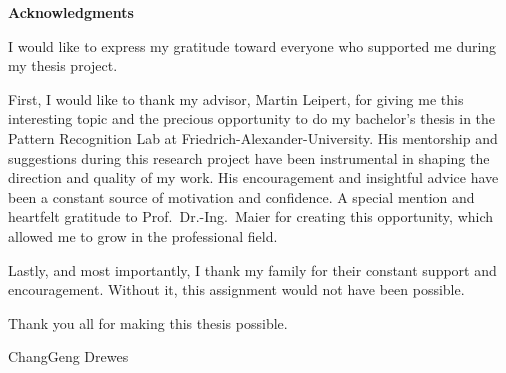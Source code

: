 \begin{center}
	\bfseries
	{Acknowledgments}
	\normalfont
\end{center}

I would like to express my gratitude toward everyone who supported me during my thesis project.

\medskip

First, I would like to thank my advisor, Martin Leipert, for giving me this interesting topic and the precious opportunity to do my bachelor's thesis in the Pattern Recognition Lab at Friedrich-Alexander-University. His mentorship and suggestions during this research project have been instrumental in shaping the direction and quality of my work. His encouragement and insightful advice have been a constant source of motivation and confidence. A special mention and heartfelt gratitude to Prof.~Dr.-Ing.~Maier for creating this opportunity, which allowed me to grow in the professional field. 

\medskip

Lastly, and most importantly, I thank my family for their constant support and encouragement. Without it, this assignment would not have been possible.

\medskip

Thank you all for making this thesis possible.

\bigskip

ChangGeng Drewes

